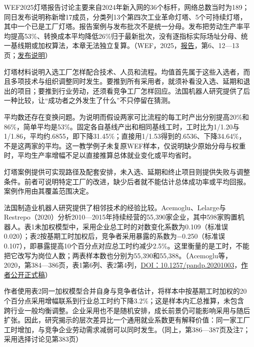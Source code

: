 \documentclass[UTF8,fontset=windows,12pt,a4paper,oneside,openany]{ctexbook}
\begin{document}
WEF2025灯塔报告讨论主要来自2024年新入网的36个标杆，网络总数当时为189；同日发布说明称新增17成员，分类列13个第四次工业革命灯塔、5个可持续灯塔，其中一个已是工厂灯塔。报告案例与发布批次不是统一分母。发布把劳动生产率平均提高53\%、转换成本平均降低26\%归于最新批次，没有逐指标实际场址分母、统一基线期或加权算法，本章无法独立复算。（WEF，2025，\href{https://reports.weforum.org/docs/WEF_Global_Lighthouse_Network_2025.pdf}{报告}，第6、12—13页；\href{https://www.weforum.org/press/2025/01/global-lighthouse-network-2025-world-economic-forum-recognizes-companies-transforming-manufacturing-through-innovation/}{发布说明}）

灯塔材料说明入选工厂怎样配合技术、人员和流程。均值首先属于这些入选者，而且多项技术与组织调整同时发生。要推到所有采用者，就须补看没入选、延期和退出的项目；要推到行业劳动，还须看竞争工厂怎样回应。法国机器人研究提供了后一种比较，让“成功者之外发生了什么”不只停留在猜测。

平均数还存在变换问题。为说明而假设两家可比流程的每工时产出分别提高20\%和86\%，简单平均是53\%。固定各自基线产出和相同基线工时，工时比为1/1.20与1/1.86，平均约.6855，即下降31.45\%；直接用1/1.53得到的.6536、下降34.64\%，不是这两家的平均。这一教学例子未复原WEF样本，仅说明缺少原始分母与权重时，平均生产率增幅不足以直接推算总体就业变化或平均省时。

灯塔案例提供可实现路径及配套安排，未入选、延期和终止项目则提供失败与调整条件。前者可说明特定工厂的改进，缺少后者就不能估计总体成功率或平均回报。案例作用由其覆盖范围决定。



法国制造业机器人研究提供了相邻技术的经验比较。Acemoglu、Lelarge与Restrepo（2020）分析2010—2015年持续经营的55,390家企业，其中598家购置机器人。表1未加权模型中，采用企业总工时的对数变化系数为0.109（标准误0.020）；表2按基期工时加权后，竞争者采用暴露的系数为\ensuremath{-}0.250（标准误0.107），即暴露提高10个百分点对应总工时约减少2.5\%。这里衡量的是工时，不能把它改写为岗位人数；两表样本数也分别为55,390和55,388。（Acemoglu等，2020，第384—386页，表1第6列、表2第4列，\href{https://doi.org/10.1257/pandp.20201003}{DOI：10.1257/pandp.20201003}，\href{https://economics.mit.edu/sites/default/files/publications/Competing\%20with\%20Robots\%20-\%20Firm-Level\%20Evidence\%20from\%20F.pdf}{作者公开正式稿}）

作者使用表2同一加权模型合并自身与竞争者估计，将样本中按基期工时加权的20个百分点采用增幅联系到行业总工时约下降3.2\%；这是样本内汇总推算，未包含跨行业一般均衡调整。企业采用也不是随机安排，成长前景仍可能影响采用与随后扩张。因此，研究揭示的层次差异比一个通用就业系数更有解释价值：同一家工厂工时增加，与竞争企业劳动需求减弱可以同时发生。（同上，第386—387页及注7；采用选择讨论见第383页）
\end{document}
